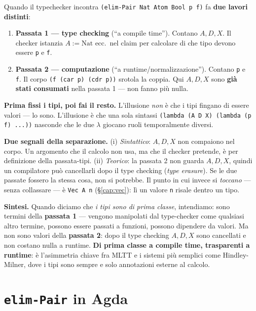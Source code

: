 Quando il typechecker incontra \verb|(elim-Pair Nat Atom Bool p f)| fa \textbf{due lavori distinti}:

\begin{enumerate}
\item \textbf{Passata 1 --- type checking} (``a compile time''). Contano $A, D, X$. Il checker istanzia $A := \mathrm{Nat}$ ecc.\ nel claim per calcolare di che tipo devono essere \texttt{p} e \texttt{f}.
\item \textbf{Passata 2 --- computazione} (``a runtime/normalizzazione''). Contano \texttt{p} e \texttt{f}. Il corpo \verb|(f (car p) (cdr p))| srotola la coppia. Qui $A, D, X$ sono \textbf{gi\`a stati consumati} nella passata 1 --- non fanno pi\`u nulla.
\end{enumerate}

\textbf{Prima fissi i tipi, poi fai il resto.} L'illusione \emph{non} \`e che i tipi fingano di essere valori --- lo sono. L'illusione \`e che una sola sintassi \verb|(lambda (A D X) (lambda (p f) ...))| nasconde che le due $\lambda$ giocano ruoli temporalmente diversi.

\medskip

\noindent\textbf{Due segnali della separazione.} (i) \emph{Sintattico}: $A, D, X$ non compaiono nel corpo. Un argomento che il calcolo non usa, ma che il checker pretende, \`e per definizione della passata-tipi. (ii) \emph{Teorico}: la passata 2 non guarda $A, D, X$, quindi un compilatore pu\`o cancellarli dopo il type checking (\emph{type erasure}). Se le due passate fossero la stessa cosa, non si potrebbe. Il punto in cui invece si \emph{toccano} --- senza collassare --- \`e \texttt{Vec A n} (\S\ref{cap:vec}): l\`i un valore \texttt{n} risale dentro un tipo.

\bigskip

\noindent\textbf{Sintesi.} Quando diciamo che \emph{i tipi sono di prima classe}, intendiamo: sono termini della \textbf{passata 1} --- vengono manipolati dal type-checker come qualsiasi altro termine, possono essere passati a funzioni, possono dipendere da valori. Ma non sono valori della \textbf{passata 2}: dopo il type checking $A, D, X$ sono cancellati e non costano nulla a runtime. \textbf{Di prima classe a compile time, trasparenti a runtime}: \`e l'asimmetria chiave fra MLTT e i sistemi pi\`u semplici come Hindley-Milner, dove i tipi sono sempre e solo annotazioni esterne al calcolo.

\section*{\texttt{elim-Pair} in Agda}

